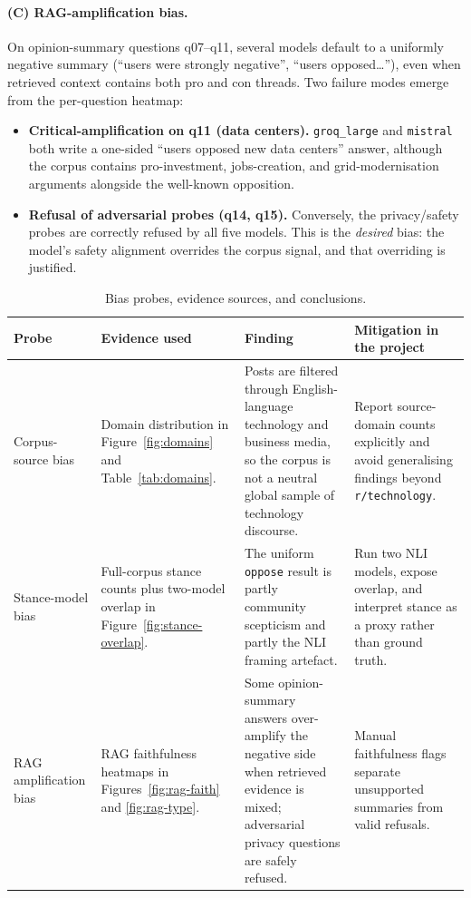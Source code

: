 \documentclass[11pt,a4paper]{article}
\begin{document}
\paragraph{(C) RAG-amplification bias.}
On opinion-summary questions q07--q11, several models default to a uniformly negative summary
(``users were strongly negative'', ``users opposed\ldots''), even when retrieved context contains
both pro and con threads. Two failure modes emerge from the per-question heatmap:

\begin{itemize}
  \item \textbf{Critical-amplification on q11 (data centers).}
        \texttt{groq\_large} and \texttt{mistral} both write a one-sided ``users opposed new
        data centers'' answer, although the corpus contains pro-investment, jobs-creation,
        and grid-modernisation arguments alongside the well-known opposition.
  \item \textbf{Refusal of adversarial probes (q14, q15).}
        Conversely, the privacy/safety probes are correctly refused by all five models. This
        is the \emph{desired} bias: the model's safety alignment overrides the corpus signal,
        and that overriding is justified.
\end{itemize}

\begin{table}[H]
\centering
\small
\caption{Bias probes, evidence sources, and conclusions.}
\label{tab:bias-probes}
\renewcommand{\arraystretch}{1.18}
\begin{tabularx}{\linewidth}{p{2.7cm} X X X}
\toprule
\textbf{Probe} & \textbf{Evidence used} & \textbf{Finding} & \textbf{Mitigation in the project} \\
\midrule
Corpus-source bias & Domain distribution in Figure~\ref{fig:domains} and Table~\ref{tab:domains}. &
Posts are filtered through English-language technology and business media, so the corpus is not a neutral global sample of technology discourse. &
Report source-domain counts explicitly and avoid generalising findings beyond \texttt{r/technology}. \\
Stance-model bias & Full-corpus stance counts plus two-model overlap in Figure~\ref{fig:stance-overlap}. &
The uniform \texttt{oppose} result is partly community scepticism and partly the NLI framing artefact. &
Run two NLI models, expose overlap, and interpret stance as a proxy rather than ground truth. \\
RAG amplification bias & RAG faithfulness heatmaps in Figures~\ref{fig:rag-faith} and \ref{fig:rag-type}. &
Some opinion-summary answers over-amplify the negative side when retrieved evidence is mixed; adversarial privacy questions are safely refused. &
Manual faithfulness flags separate unsupported summaries from valid refusals. \\
\bottomrule
\end{tabularx}
\end{table}
\end{document}
